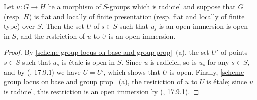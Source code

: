 \begin{corollary}\label{scheme group radiciel morphism locus of open immersion}
Let $u:G\to H$ be a morphism of $S$-groups which is radiciel and suppose that $G$ (resp. $H$) is flat and locally of finite presentation (resp. flat and locally of finite type) over $S$. Then the set $U$ of $s\in S$ such that $u_s$ is an open immersion is open in $S$, and the restriction of $u$ to $U$ is an open immersion.
\end{corollary}
\begin{proof}
By \cref{scheme group locus on base and group prop}~(a), the set $U'$ of points $s\in S$ such that $u_s$ is \'etale is open in $S$. Since $u$ is radiciel, so is $u_s$ for any $s\in S$, and by (\cite{EGA4-4}, 17.9.1) we have $U=U'$, which shows that $U$ is open. Finally, \cref{scheme group locus on base and group prop}~(a), the restriction of $u$ to $U$ is \'etale; since $u$ is radiciel, this restriction is an open immersion by (\cite{EGA4-4}, 17.9.1).
\end{proof}

